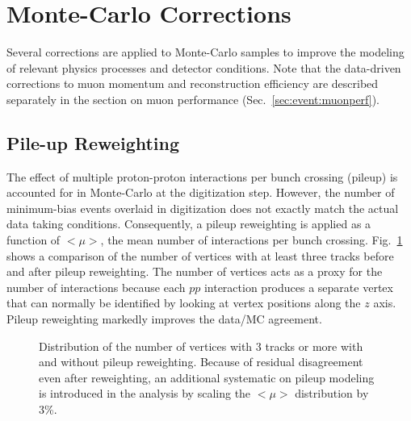 \section{Monte-Carlo Corrections}
Several corrections are applied to Monte-Carlo samples to improve the modeling of relevant physics processes and detector conditions. Note that the data-driven corrections to muon momentum and reconstruction efficiency are described separately in the section on muon performance (Sec.~\ref{sec:event:muonperf}).

\subsection{Pile-up Reweighting }
The effect of multiple proton-proton interactions per bunch crossing (pileup) is accounted for in Monte-Carlo at the digitization step. However, the number of minimum-bias events overlaid in digitization does not exactly match the actual data taking conditions. Consequently, a pileup reweighting is applied as a function of $<\mu>$, the mean number of interactions per bunch crossing.
Fig.~\ref{fig:mc:nvtx} shows a comparison of the number of vertices with at least three tracks before and after pileup reweighting. The number of vertices acts as a proxy for the number of interactions because each $pp$ interaction produces a separate vertex that can normally be identified by looking at vertex positions along the $z$ axis. Pileup reweighting markedly improves the data/MC agreement.

\begin{figure}[phtb]
  \begin{center}
 \caption{ Distribution of the number of vertices with 3 tracks or more with and without pileup reweighting. Because of residual disagreement even after reweighting, an additional systematic on pileup modeling is introduced in the analysis by scaling the $<\mu>$ distribution by 3\%.}
 \label{fig:mc:nvtx}
 \end{center}
\end{figure}

